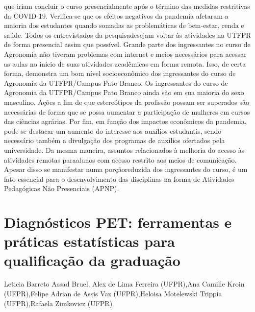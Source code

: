 que iriam concluir o curso presencialmente após o término das medidas restritivas da COVID-19. 
Verifica-se que os efeitos negativos da pandemia afetaram a maioria dos estudantes quando
somadas as problemáticas de bem-estar, renda e saúde. Todos os entrevistados da pesquisadesejam
voltar às atividades na UTFPR de forma presencial assim que possível. Grande parte dos
ingressantes no curso de Agronomia não tiveram problemas com internet e meios necessários para
acessar as aulas no início de suas atividades acadêmicas em forma remota. Isso, de certa forma,
demonstra um bom nível socioeconômico dos ingressantes do curso de Agronomia da
UTFPR/Campus Pato Branco.
Os ingressantes do curso de Agronomia da UTFPR/Campus Pato Branco ainda são em sua
maioria do sexo masculino. Ações a fim de que estereótipos da profissão possam ser superados
são necessárias de forma que se possa aumentar a participação de mulheres em cursos das ciências
agrárias. Por fim, em função dos impactos econômicos da pandemia, pode-se destacar um aumento
do interesse aos auxílios estudantis, sendo necessário também a divulgação dos programas de
auxílios ofertados pela universidade. Da mesma maneira, assuntos relacionados à melhoria do
acesso às atividades remotas paraalunos com acesso restrito aos meios de comunicação. Apesar 
disso se manifestar numa porçãoreduzida dos ingressantes do curso, é um fato essencial para o 
desenvolvimento das disciplinas na forma de Atividades Pedagógicas Não Presenciais (APNP).



\section{Diagnósticos PET: ferramentas e práticas estatísticas para qualificação da graduação}

Leticia Barreto Assad Bruel, Alex de Lima Ferreira (UFPR),Ana Camille Kroin (UFPR),Felipe Adrian de Assis Vaz (UFPR),Heloisa Motelewski Trippia (UFPR),Rafaela Zimkovicz (UFPR)

